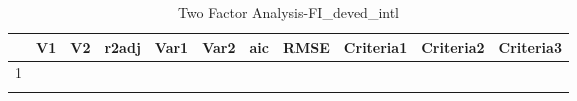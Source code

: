 \begin{longtable}{rllrrrrrlll}
  \hline
 & V1 & V2 & r2adj & Var1 & Var2 & aic & RMSE & Criteria1 & Criteria2 & Criteria3 \\ 
  \hline
1 &  &  &  &  &  &  &  &  &  &  \\ 
   \hline
\hline
\caption{Two Factor Analysis-FI_deved_intl} 
\end{longtable}
